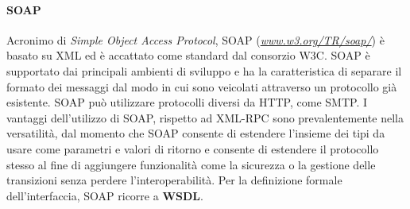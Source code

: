 \paragraph{SOAP}
Acronimo di \textit{Simple Object Access Protocol}, SOAP (\emph{\url{www.w3.org/TR/soap/}}) è basato su XML ed è accattato come standard dal consorzio W3C.
SOAP è supportato dai principali ambienti di sviluppo e ha la caratteristica di separare il formato dei messaggi dal modo in cui sono veicolati attraverso un protocollo già esistente. 
SOAP può utilizzare protocolli diversi da HTTP, come SMTP.
I vantaggi dell'utilizzo di SOAP, rispetto ad XML-RPC sono prevalentemente nella versatilità, dal momento che SOAP consente di estendere l'insieme dei tipi da usare come parametri e valori di ritorno e consente di estendere il protocollo stesso al fine di aggiungere funzionalità come la sicurezza o la gestione delle transizioni senza perdere l'interoperabilità.
Per la definizione formale dell'interfaccia, SOAP ricorre a \textbf{WSDL}.
